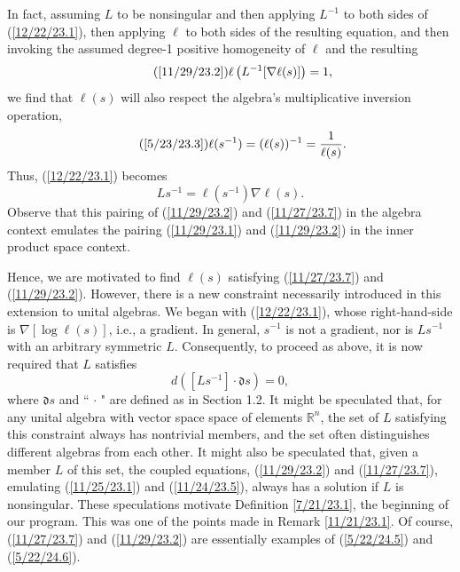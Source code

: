 \documentclass{amsart}
\numberwithin{equation}{section}
\theoremstyle{definition}
\numberwithin{theorem}{section}
\begin{document}
In fact, assuming $L$ to be nonsingular and then applying $L^{-1}$ to both sides of (\ref{12/22/23.1}), then applying $\ell$ to both sides of the resulting equation, and then invoking the assumed degree-1 positive homogeneity of $\ell$ and the resulting \begin{equation}\tag{\ref{11/29/23.2}}\ell\left(L^{-1}[\nabla\ell(s)]\right) = 1,\end{equation} we find that $\ell(s)$ will also respect the algebra's multiplicative inversion operation, \begin{equation}\tag{\ref{5/23/23.3}} \ell(s^{-1}) = (\ell(s))^{-1} = \frac{1}{\ell(s)}.\end{equation}    Thus, (\ref{12/22/23.1}) becomes \begin{equation}\label{11/27/23.7} Ls^{-1} = \ell(s^{-1})\nabla\ell(s).\end{equation}    Observe that this pairing of (\ref{11/29/23.2}) and (\ref{11/27/23.7}) in the algebra context emulates the pairing (\ref{11/29/23.1}) and (\ref{11/29/23.2}) in the inner product space context.
  
  Hence, we are motivated to find $\ell(s)$ satisfying (\ref{11/27/23.7}) and (\ref{11/29/23.2}). 
  However, there is a new constraint necessarily introduced in this extension to unital algebras.  We began with (\ref{12/22/23.1}), whose right-hand-side is $\nabla[\log\ell(s)]$, i.e., a gradient.  In general, $s^{-1}$ is not a gradient, nor is $Ls^{-1}$ with an arbitrary symmetric $L$. Consequently, to proceed as above, it is now required that $L$ satisfies \[ d([Ls^{-1}]\cdot \mathfrak{d}s) = 0,\] where $\mathfrak{d}s$ and `` $\cdot$ " are defined as in Section 1.2.  It might be speculated that, for any unital algebra with vector space space of elements $\mathbb{R}^n$, the set of $L$ satisfying this constraint always has nontrivial members, and the set often distinguishes different algebras from each other.  It might also be speculated that, given a member $L$ of this set,  the coupled equations, (\ref{11/29/23.2}) and (\ref{11/27/23.7}), emulating (\ref{11/25/23.1}) and (\ref{11/24/23.5}), always has a solution if $L$ is nonsingular.
  These speculations motivate Definition \ref{7/21/23.1}, the beginning of our program.  This was one of the points made in  Remark \ref{11/21/23.1}.  Of course, (\ref{11/27/23.7}) and (\ref{11/29/23.2}) are essentially examples of (\ref{5/22/24.5}) and (\ref{5/22/24.6}). 
\end{document}

